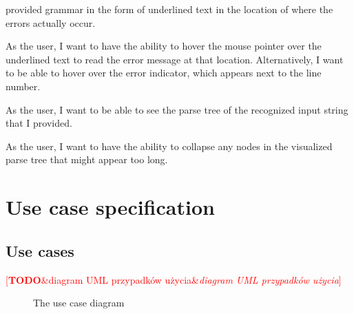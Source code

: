 \documentclass[english,engineering]{wizthesis}
\newcommand{\todo}[1]{%
  \textcolor{red}{[\textbf{TODO}\ifx&#1&{}\else{ }\fi\emph{#1}]}%
}
\begin{document}
\begin{description}[align=left,leftmargin=4em,style=multiline]
  provided grammar in the form of underlined text in the location of where the
  errors actually occur.
  \item[US13] As the user, I want to have the ability to hover the mouse pointer
  over the underlined text to read the error message at that location.
  Alternatively, I want to be able to hover over the error indicator, which
  appears next to the line number.
  \item[US14] As the user, I want to be able to see the parse tree of the
  recognized input string that I provided.
  \item[US15] As the user, I want to have the ability to collapse any nodes in
  the visualized parse tree that might appear too long.
\end{description}


\section{Use case specification}

\subsection{Use cases}

\todo{diagram UML przypadków użycia}

\begin{figure}[H]
  \centering

  \caption{The use case diagram}
  \label{fig:use-case-diagram}
\end{figure}
\end{document}
